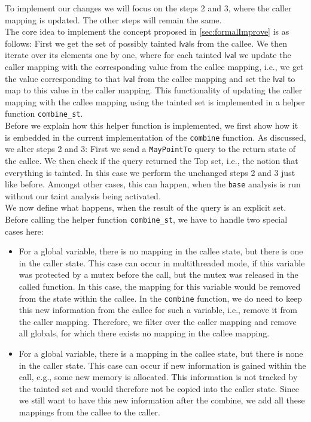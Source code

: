       To implement our changes we will focus on the steps 2 and 3, where the caller mapping is updated. The other steps will remain the same.\\
      The core idea to implement the concept proposed in \autoref{sec:formalImprove} is as follows: First we get the set of possibly tainted $\textsf{lval}$s from the callee. We then iterate over its elements one by one, where for each tainted $\textsf{lval}$ we update the caller mapping with the corresponding value from the callee mapping, i.e., we get the value corresponding to that $\textsf{lval}$ from the callee mapping and set the $\textsf{lval}$ to map to this value in the caller mapping. This functionality of updating the caller mapping with the callee mapping using the tainted set is implemented in a helper function \texttt{combine\_st}.\\
      Before we explain how this helper function is implemented, we first show how it is embedded in the current implementation of the \texttt{combine} function. As discussed, we alter steps 2 and 3: First we send a \texttt{MayPointTo} query to the return state of the callee. We then check if the query returned the Top set, i.e., the notion that everything is tainted. In this case we perform the unchanged steps 2 and 3 just like before. Amongst other cases, this can happen, when the \texttt{base} analysis is run without our taint analysis being activated.\\
      We now define what happens, when the result of the query is an explicit set. Before calling the helper function \texttt{combine\_st}, we have to handle two special cases here:
      \begin{itemize}
        \item For a global variable, there is no mapping in the callee state, but there is one in the caller state. This case can occur in multithreaded mode, if this variable was protected by a mutex before the call, but the mutex was released in the called function. In this case, the mapping for this variable would be removed from the state within the callee. In the \texttt{combine} function, we do need to keep this new information from the callee for such a variable, i.e., remove it from the caller mapping. Therefore, we filter over the caller mapping and remove all globals, for which there exists no mapping in the callee mapping.

        \item For a global variable, there is a mapping in the callee state, but there is none in the caller state. This case can occur if new information is gained within the call, e.g., some new memory is allocated. This information is not tracked by the tainted set and would therefore not be copied into the caller state. Since we still want to have this new information after the combine, we add all these mappings from the callee to the caller.
      \end{itemize}
